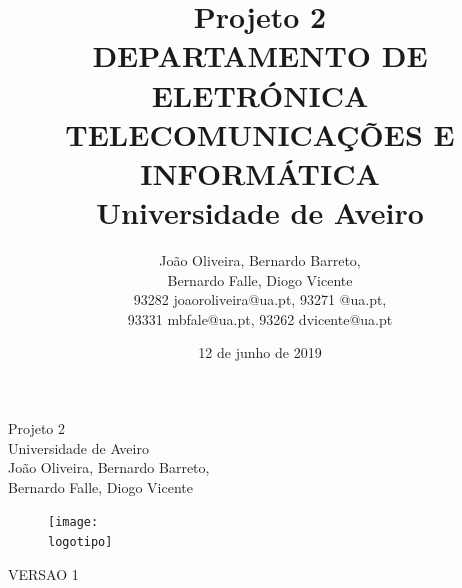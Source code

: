 \documentclass{report}
\begin{document}
%
\def\titulo{Projeto 2}
\def\data{12 de junho de 2019}
\def\autores{João Oliveira, Bernardo Barreto,\\ Bernardo Falle, Diogo Vicente}
\def\autorescontactos{93282 joaoroliveira@ua.pt, 93271 @ua.pt,\\ 93331 mbfale@ua.pt, 93262 dvicente@ua.pt}
\def\versao{VERSAO 1}
\def\departamento{DEPARTAMENTO DE ELETRÓNICA TELECOMUNICAÇÕES E INFORMÁTICA}
\def\empresa{Universidade de Aveiro}
\def\logotipo{ua.pdf}
%
%
\begin{titlepage}

\begin{center}
%
\vspace*{50mm}
%
{\Huge \titulo}\\ 
%
\vspace{10mm}
%
{\Large \empresa}\\
%
\vspace{10mm}
%
{\LARGE \autores}\\ 
%
\vspace{30mm}
%
\begin{figure}[h]
\center
\texttt{[image: \\logotipo]}
\end{figure}
%
\vspace{30mm}
\end{center}
%
\begin{flushright}
\versao
\end{flushright}
\end{titlepage}

\title{%
{\Huge\textbf{\titulo}}\\
{\Large \departamento\\ \empresa}
}
%
\author{%
    \autores \\
    \autorescontactos
}
%
\date{\data}
%
\maketitle

\end{document}

